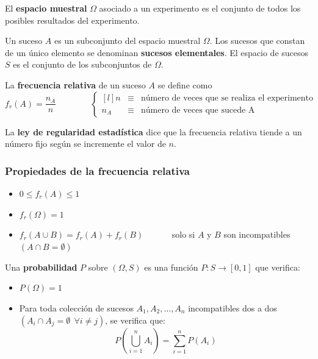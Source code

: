 \documentclass[a4paper]{book}
\begin{document}
\begin{definicion}
	El \textbf{espacio muestral} $ \Omega $ asociado a un experimento es el conjunto de todos los posibles resultados del experimento.

	Un suceso $A$ es un subconjunto del espacio muestral $\Omega$. Los sucesos que constan de un único elemento se denominan \textbf{sucesos elementales}. El espacio de sucesos $S$ es el conjunto de los subconjuntos de $\Omega$.
\end{definicion}

\begin{definicion}
	La \textbf{frecuencia relativa} de un suceso $A$ se define como \[f_r(A) = \frac{n_A}{n} \qquad \qquad \left\lbrace \begin{matrix*}[l] n & \equiv & \text{número de veces que se realiza el experimento}\\
			n_A & \equiv & \text{número de veces que sucede A}
		\end{matrix*} \right. \]

	La \textbf{ley de regularidad estadística} dice que la frecuencia relativa tiende a un número fijo según se incremente el valor de $n$.
\end{definicion}

\subsubsection*{Propiedades de la frecuencia relativa}
\begin{itemize}
	\item $0\leq f_r(A)\leq 1$
	\item $f_r(\Omega )=1$
	\item $ f_r\left( A \cup B \right) = f_r(A) + f_r(B)\qquad \quad $ solo si $A$ y $B$ son incompatibles $\left( A \cap B = \emptyset \right)$
\end{itemize}
\newpage

\begin{definicion}
	Una \textbf{probabilidad} $P$ sobre $(\Omega, S)$ es una función $P: S \longrightarrow [0,1]$ que verifica:
\end{definicion}

\begin{itemize}
	\item $P(\Omega )=1$
	\item Para toda colección de sucesos $A_1,A_2,\ldots , A_n$ incompatibles dos a dos\\ $\left( A_i \cap A_j = \emptyset \ \ \forall i \not = j \right)$, se verifica que: \[P\left( \bigcup _{i=1}^n A_i \right) = \sum^{n}_{i=1}{P\left( A_i \right)} \]
\end{itemize}
\end{document}
